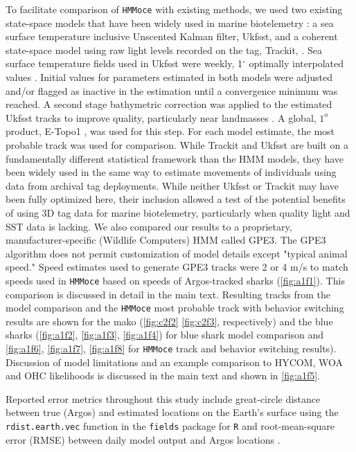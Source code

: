 To facilitate comparison of \texttt{HMMoce} with existing methods, we
used two existing state-space models that have been widely used in
marine biotelemetry
\citep[e.g.][]{Braun2015a, Galuardi2012, Lam2014, Lam2016, Thorrold2014a, Winship2012}:
a sea surface temperature inclusive Unscented Kalman filter, Ukfsst,
\citep{Lam2008, Nielsen2007} and a coherent state-space model using raw
light levels recorded on the tag, Trackit, \citep{Nielsen2007}. Sea
surface temperature fields used in Ukfsst were weekly, 1$^{\circ}$ optimally
interpolated values \citep{Reynolds2002}. Initial values for parameters
estimated in both models were adjusted and/or flagged as inactive in the
estimation until a convergence minimum was reached. A second stage
bathymetric correction was applied to the estimated Ukfsst tracks to
improve quality, particularly near landmasses \citep{Galuardi2010}. A
global, $1^o$ product, E-Topo1 \citep{Amante2009}, was used for this
step. For each model estimate, the most probable track was used for
comparison. While Trackit and Ukfsst are built on a fundamentally
different statistical framework than the HMM models, they have been
widely used in the same way to estimate movements of individuals using
data from archival tag deployments. While neither Ukfsst or Trackit may
have been fully optimized here, their inclusion allowed a test of the
potential benefits of using 3D tag data for marine biotelemetry,
particularly when quality light and SST data is lacking. We also
compared our results to a proprietary, manufacturer-specific (Wildlife
Computers) HMM called GPE3. The GPE3 algorithm does not permit
customization of model details except "typical animal speed." Speed
estimates used to generate GPE3 tracks were 2 or 4 m/s to match speeds
used in \texttt{HMMoce} based on speeds of Argos-tracked sharks (\cref{fig:a1f1}). This comparison is discussed in detail in the main text. Resulting
tracks from the model comparison and the \texttt{HMMoce} most probable
track with behavior switching results are shown for the mako (\cref{fig:c2f2} \cref{fig:c2f3}, respectively) and the blue sharks (\cref{fig:a1f2}, \cref{fig:a1f3}, \cref{fig:a1f4})
for blue shark model comparison and \cref{fig:a1f6}, \cref{fig:a1f7}, \cref{fig:a1f8} for \texttt{HMMoce}
track and behavior switching results). Discussion of model limitations
and an example comparison to HYCOM, WOA and OHC likelihoods is discussed
in the main text and shown in \cref{fig:a1f5}.

Reported error metrics throughout this study include great-circle
distance between true (Argos) and estimated locations on the Earth's
surface using the \texttt{rdist.earth.vec} function in the
\texttt{fields} \citep{Douglas-Nychka2015} package for \texttt{R} and
root-mean-square error (RMSE) between daily model output and Argos
locations \citep{Galuardi2008, Wilson2007, Braun2015a}.

